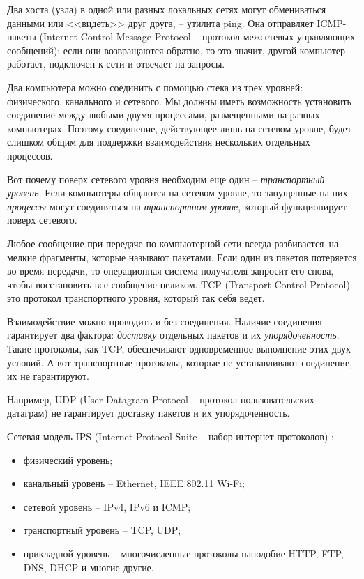 \documentclass[%
	11pt,
	a4paper,
	utf8,
		]{article}
\begin{document}
Два хоста (узла) в одной или разных локальных сетях могут обмениваться данными или <<видеть>> друг друга, -- утилита ping. Она отправляет ICMP-пакеты (Internet Control Message Protocol -- протокол межсетевых управляющих сообщений); если они возвращаются обратно, то это значит, другой компьютер работает, подключен к сети и отвечает на запросы.

Два компьютера можно соединить с помощью стека из трех уровней: физического, канального и сетевого. Мы должны иметь возможность установить соединение между любыми двумя процессами, размещенными на разных компьютерах. Поэтому соединение, действующее лишь на сетевом уровне, будет слишком общим для поддержки взаимодействия нескольких отдельных процессов.

Вот почему поверх сетевого уровня необходим еще один -- \emph{транспортный уровень}. Если компьютеры общаются на сетевом уровне, то запущенные на них \emph{процессы} могут соединяться на \emph{транспортном уровне}, который функционирует поверх сетевого.

Любое сообщение при передаче по компьютерной сети всегда разбивается на мелкие фрагменты, которые называют пакетами. Если один из пакетов потеряется во время передачи, то операционная система получателя запросит его снова, чтобы восстановить все сообщение целиком. TCP (Transport Control Protocol) -- это протокол транспортного уровня, который так себя ведет.

Взаимодействие можно проводить и без соединения. Наличие соединения гарантирует два фактора: \emph{доставку} отдельных пакетов и их \emph{упорядоченность}. Такие протоколы, как TCP, обеспечивают одновременное выполнение этих двух условий. А вот транспортные протоколы, которые не устанавливают соединение, их не гарантируют.

Например, UDP (User Datagram Protocol -- протокол пользовательских датаграм) не гарантирует доставку пакетов и их упорядоченность.

Сетевая модель IPS (Internet Protocol Suite -- набор интернет-протоколов) \cite[]{amini-extreme-c:2022}:
\begin{itemize}
	\item физический уровень;
	
	\item канальный уровень -- Ethernet, IEEE 802.11 Wi-Fi;
	
	\item сетевой уровень -- IPv4, IPv6 и ICMP;
	
	\item транспортный уровень -- TCP, UDP;
	
	\item прикладной уровень -- многочисленные протоколы наподобие HTTP, FTP, DNS, DHCP и многие другие.
\end{itemize}
\end{document}
